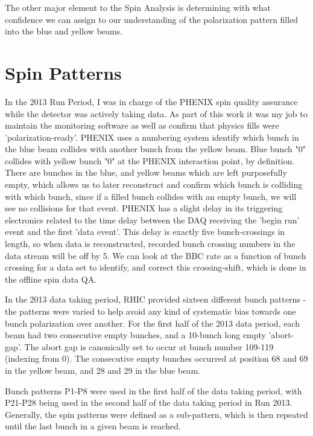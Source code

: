 The other major element to the Spin Analysis is determining with what confidence
we can assign to our understanding of the polarization pattern filled into the
blue and yellow beams.

\section{Spin Patterns}

In the 2013 Run Period, I was in charge of the PHENIX spin quality assurance
while the detector was actively taking data. As part of this work it was my job
to maintain the monitoring software as well as confirm that physics fills were
'polarization-ready'. PHENIX uses a numbering system identify which bunch in the
blue beam collides with another bunch from the yellow beam. Blue bunch "0"
collides with yellow bunch "0" at the PHENIX interaction point, by definition.
There are bunches in the blue, and yellow beams which are left purposefully
empty, which allows us to later reconstruct and confirm which bunch is colliding
with which bunch, since if a filled bunch collides with an empty bunch, we will
see no collisions for that event. PHENIX has a slight delay in its triggering
electronics related to the time delay between the DAQ receiving the 'begin run'
event and the first 'data event'. This delay is exactly five bunch-crossings in
length, so when data is reconstructed, recorded bunch crossing numbers in the
data stream will be off by 5. We can look at the BBC rate as a function of bunch
crossing for a data set to identify, and correct this crossing-shift, which is
done in the offline spin data QA.

In the 2013 data taking period, RHIC provided sixteen different bunch patterns -
the patterns were varied to help avoid any kind of systematic bias towards one
bunch polarization over another. For the first half of the 2013 data period,
each beam had two consecutive empty bunches, and a 10-bunch long empty
'abort-gap'. The abort gap is canonically set to occur at bunch number 109-119
(indexing from 0). The consecutive empty bunches occurred at position 68 and 69
in the yellow beam, and 28 and 29 in the blue beam.

Bunch patterns P1-P8 were used in the first half of the data taking period, with
P21-P28 being used in the second half of the data taking period in Run 2013.
Generally, the spin patterns were defined as a sub-pattern, which is then
repeated until the last bunch in a given beam is reached.

